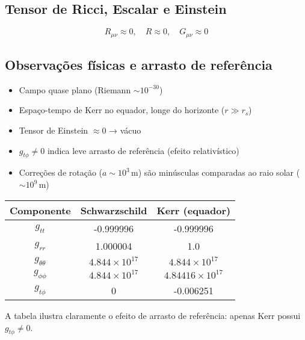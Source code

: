 \documentclass[12pt,a4paper]{article}
\begin{document}
\subsection*{Tensor de Ricci, Escalar e Einstein}
\[
R_{\mu\nu} \approx 0, \quad R \approx 0, \quad G_{\mu\nu} \approx 0
\]

\subsection*{Observações físicas e arrasto de referência}

\begin{itemize}
\item Campo quase plano (Riemann $\sim 10^{-30}$)
\item Espaço-tempo de Kerr no equador, longe do horizonte ($r \gg r_s$)
\item Tensor de Einstein $\approx 0$ → vácuo
\item $g_{t\phi} \neq 0$ indica leve arrasto de referência (efeito relativístico)
\item Correções de rotação ($a \sim 10^3\,\text{m}$) são minúsculas comparadas ao raio solar ($\sim 10^9\,\text{m}$)
\end{itemize}

\begin{center}
\begin{tabular}{|c|c|c|}
\hline
Componente & Schwarzschild & Kerr (equador) \\
\hline
$g_{tt}$ & -0.999996 & -0.999996 \\
$g_{rr}$ & 1.000004 & 1.0 \\
$g_{\theta\theta}$ & $4.844\times10^{17}$ & $4.844\times10^{17}$ \\
$g_{\phi\phi}$ & $4.844\times10^{17}$ & $4.84416\times10^{17}$ \\
$g_{t\phi}$ & 0 & -0.006251 \\
\hline
\end{tabular}
\end{center}

A tabela ilustra claramente o efeito de arrasto de referência: apenas Kerr possui $g_{t\phi} \neq 0$.
\end{document}
